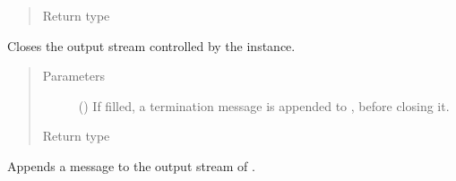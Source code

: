 \documentclass[letterpaper,10pt,english]{sphinxmanual}
\begin{document}
\begin{fulllineitems}
\begin{fulllineitems}
\begin{quote}
\begin{description}
\begin{itemize}
\end{itemize}

\item[{Return type}] \leavevmode
{}

\end{description}\end{quote}

\end{fulllineitems}


\begin{fulllineitems}
\label{\detokenize{app.domain.helpers:app.domain.helpers.smart_dataclasses.FileData.fclose}}
Closes the output stream controlled by the  instance.
\begin{quote}\begin{description}
\item[{Parameters}] \leavevmode
{} (\sphinxstyleliteralemphasis{\sphinxupquote{{[}}}\sphinxstyleliteralemphasis{\sphinxupquote{{]}}}) \textendash{} If filled, a termination message is appended to
{\hyperref[\detokenize{app.domain.helpers:app.domain.helpers.smart_dataclasses.FileData.out_file}]{}}, before closing it.

\item[{Return type}] \leavevmode
{}

\end{description}\end{quote}

\end{fulllineitems}


\begin{fulllineitems}
\label{\detokenize{app.domain.helpers:app.domain.helpers.smart_dataclasses.FileData.fwrite}}
Appends a message to the output stream of .


\end{fulllineitems}
\end{fulllineitems}
\end{document}
